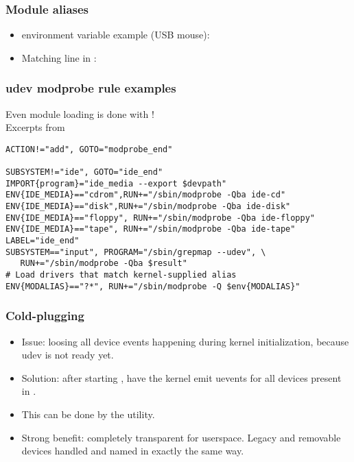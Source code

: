 \begin{frame}
  \frametitle{Module aliases}
  \begin{itemize}
  \item {} environment variable example (USB mouse):\\
  \item Matching line in :\\
  \end{itemize}
\end{frame}

\begin{frame}[fragile]
  \frametitle{udev modprobe rule examples}
  Even module loading is done with !\\
  Excerpts from 
  \begin{block}{}
\footnotesize
\begin{verbatim}
ACTION!="add", GOTO="modprobe_end"

SUBSYSTEM!="ide", GOTO="ide_end"
IMPORT{program}="ide_media --export $devpath"
ENV{IDE_MEDIA}=="cdrom",RUN+="/sbin/modprobe -Qba ide-cd"
ENV{IDE_MEDIA}=="disk",RUN+="/sbin/modprobe -Qba ide-disk"
ENV{IDE_MEDIA}=="floppy", RUN+="/sbin/modprobe -Qba ide-floppy"
ENV{IDE_MEDIA}=="tape", RUN+="/sbin/modprobe -Qba ide-tape"
LABEL="ide_end"
SUBSYSTEM=="input", PROGRAM="/sbin/grepmap --udev", \
   RUN+="/sbin/modprobe -Qba $result"
# Load drivers that match kernel-supplied alias
ENV{MODALIAS}=="?*", RUN+="/sbin/modprobe -Q $env{MODALIAS}"
\end{verbatim}
  \end{block}
\end{frame}

\begin{frame}
  \frametitle{Cold-plugging}
  \begin{itemize}
  \item Issue: loosing all device events happening during kernel
    initialization, because udev is not ready yet.
  \item Solution: after starting , have the kernel emit
    uevents for all devices present in \code{/sys}.
  \item This can be done by the  utility.
  \item Strong benefit: completely transparent for userspace. Legacy
    and removable devices handled and named in exactly the same way.
  \end{itemize}
\end{frame}

